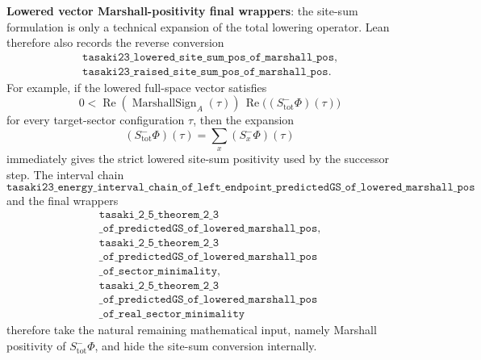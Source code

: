\documentclass[a4paper,11pt]{article}
\begin{document}
\textbf{Lowered vector Marshall-positivity final wrappers}: the
site-sum formulation is only a technical expansion of the total lowering
operator.  Lean therefore also records the reverse conversion
\[
\begin{gathered}
\texttt{tasaki23\_lowered\_site\_sum\_pos\_of\_marshall\_pos},\\
\texttt{tasaki23\_raised\_site\_sum\_pos\_of\_marshall\_pos}.
\end{gathered}
\]
For example, if the lowered full-space vector satisfies
\[
  0 <
  \operatorname{Re}(\operatorname{MarshallSign}_A(\tau))\,
  \operatorname{Re}\bigl((S^-_{\mathrm{tot}}\Phi)(\tau)\bigr)
\]
for every target-sector configuration \(\tau\), then the expansion
\[
  (S^-_{\mathrm{tot}}\Phi)(\tau)
    = \sum_x (S^-_x\Phi)(\tau)
\]
immediately gives the strict lowered site-sum positivity used by the
successor step.  The interval chain
\[
\texttt{tasaki23\_energy\_interval\_chain\_of\_left\_endpoint}
\texttt{\_predictedGS\_of\_lowered\_marshall\_pos}
\]
and the final wrappers
\[
\begin{gathered}
\texttt{tasaki\_2\_5\_theorem\_2\_3}\\
\texttt{\_of\_predictedGS\_of\_lowered\_marshall\_pos},\\
\texttt{tasaki\_2\_5\_theorem\_2\_3}\\
\texttt{\_of\_predictedGS\_of\_lowered\_marshall\_pos}\\
\texttt{\_of\_sector\_minimality},\\
\texttt{tasaki\_2\_5\_theorem\_2\_3}\\
\texttt{\_of\_predictedGS\_of\_lowered\_marshall\_pos}\\
\texttt{\_of\_real\_sector\_minimality}
\end{gathered}
\]
therefore take the natural remaining mathematical input, namely
Marshall positivity of \(S^-_{\mathrm{tot}}\Phi\), and hide the
site-sum conversion internally.
\end{document}
